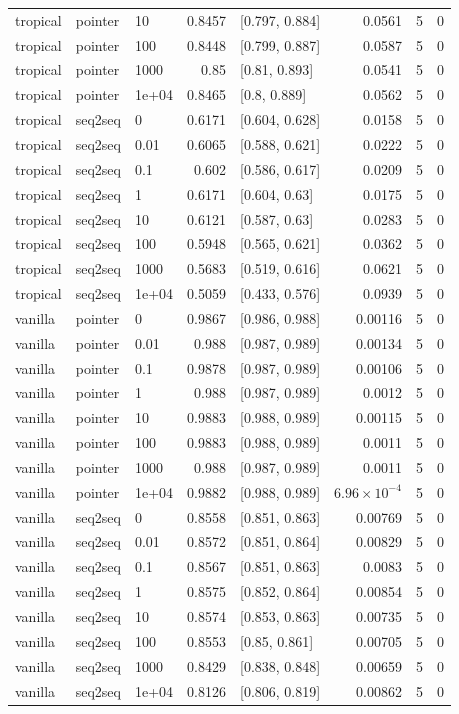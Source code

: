 \documentclass[10pt]{article}
\begin{document}
{\begin{longtable}{lllrlrrr}
tropical & pointer & 10 & 0.8457 & [0.797, 0.884] & 0.0561 & 5 & 0\\
tropical & pointer & 100 & 0.8448 & [0.799, 0.887] & 0.0587 & 5 & 0\\
tropical & pointer & 1000 & 0.85 & [0.81, 0.893] & 0.0541 & 5 & 0\\
tropical & pointer & 1e+04 & 0.8465 & [0.8, 0.889] & 0.0562 & 5 & 0\\
tropical & seq2seq & 0 & 0.6171 & [0.604, 0.628] & 0.0158 & 5 & 0\\
tropical & seq2seq & 0.01 & 0.6065 & [0.588, 0.621] & 0.0222 & 5 & 0\\
tropical & seq2seq & 0.1 & 0.602 & [0.586, 0.617] & 0.0209 & 5 & 0\\
tropical & seq2seq & 1 & 0.6171 & [0.604, 0.63] & 0.0175 & 5 & 0\\
tropical & seq2seq & 10 & 0.6121 & [0.587, 0.63] & 0.0283 & 5 & 0\\
tropical & seq2seq & 100 & 0.5948 & [0.565, 0.621] & 0.0362 & 5 & 0\\
tropical & seq2seq & 1000 & 0.5683 & [0.519, 0.616] & 0.0621 & 5 & 0\\
tropical & seq2seq & 1e+04 & 0.5059 & [0.433, 0.576] & 0.0939 & 5 & 0\\
vanilla & pointer & 0 & 0.9867 & [0.986, 0.988] & 0.00116 & 5 & 0\\
vanilla & pointer & 0.01 & 0.988 & [0.987, 0.989] & 0.00134 & 5 & 0\\
vanilla & pointer & 0.1 & 0.9878 & [0.987, 0.989] & 0.00106 & 5 & 0\\
vanilla & pointer & 1 & 0.988 & [0.987, 0.989] & 0.0012 & 5 & 0\\
vanilla & pointer & 10 & 0.9883 & [0.988, 0.989] & 0.00115 & 5 & 0\\
vanilla & pointer & 100 & 0.9883 & [0.988, 0.989] & 0.0011 & 5 & 0\\
vanilla & pointer & 1000 & 0.988 & [0.987, 0.989] & 0.0011 & 5 & 0\\
vanilla & pointer & 1e+04 & 0.9882 & [0.988, 0.989] & $6.96\times10^{-4}$ & 5 & 0\\
vanilla & seq2seq & 0 & 0.8558 & [0.851, 0.863] & 0.00769 & 5 & 0\\
vanilla & seq2seq & 0.01 & 0.8572 & [0.851, 0.864] & 0.00829 & 5 & 0\\
vanilla & seq2seq & 0.1 & 0.8567 & [0.851, 0.863] & 0.0083 & 5 & 0\\
vanilla & seq2seq & 1 & 0.8575 & [0.852, 0.864] & 0.00854 & 5 & 0\\
vanilla & seq2seq & 10 & 0.8574 & [0.853, 0.863] & 0.00735 & 5 & 0\\
vanilla & seq2seq & 100 & 0.8553 & [0.85, 0.861] & 0.00705 & 5 & 0\\
vanilla & seq2seq & 1000 & 0.8429 & [0.838, 0.848] & 0.00659 & 5 & 0\\
vanilla & seq2seq & 1e+04 & 0.8126 & [0.806, 0.819] & 0.00862 & 5 & 0\\
\bottomrule
\end{longtable}
}
\end{document}
